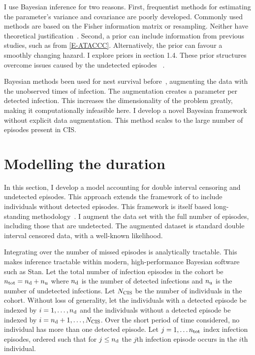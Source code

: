 \documentclass[thesis.tex]{subfiles}
\begin{document}
I use Bayesian inference for two reasons.
First, frequentist methods for estimating the parameter's variance and covariance are poorly developed.
Commonly used methods are based on the Fisher information matrix or resampling.
Neither have theoretical justification~\autocite[230]{sunAnalysis}.
Second, a prior can include information from previous studies, such as from \cref{E-ATACCC}.
Alternatively, the prior can favour a smoothly changing hazard.
I explore priors in section 1.4.
These prior structures overcome issues caused by the undetected episodes ~\autocite{caoBias}.

Bayesian methods been used for nest survival before~\autocites{heBayesiana}{heBayesian}{caoModeling}, augmenting the data with the unobserved times of infection.
The augmentation creates a parameter per detected infection.
This increases the dimensionality of the problem greatly, making it computationally infeasible here.
I develop a novel Bayesian framework without explicit data augmentation.
This method scales to the large number of episodes present in CIS.


\section{Modelling the duration}\label{perf-test:sec:model}

In this section, I develop a model accounting for double interval censoring and undetected episodes.
This approach extends the framework of \textcite{heiseyModelling} to include individuals without detected episodes.
This framework is itself based long-standing methodology~\autocites{dempsterMaximum}{turnbullEmpirical}.
I augment the data set with the full number of episodes, including those that are undetected.
The augmented dataset is standard double interval censored data, with a well-known likelihood.

Integrating over the number of missed episodes is analytically tractable.
This makes inference tractable within modern, high-performance Bayesian software such as Stan.
Let the total number of infection episodes in the cohort be $n_\text{tot} = n_\text{d} + n_\text{u}$ where $n_\text{d}$ is the number of detected infections and $n_\text{u}$ is the number of undetected infections.
Let $N_\text{CIS}$ be the number of individuals in the cohort.
Without loss of generality, let the individuals with a detected episode be indexed by $i = 1, \dots, n_\text{d}$ and the individuals without a detected episode be indexed by $i = n_\text{d} + 1, \dots, N_\text{CIS}$.
Over the short period of time considered, no individual has more than one detected episode. 
Let $j = 1, \dots n_\text{tot}$ index infection episodes, ordered such that for $j \leq n_\text{d}$ the $j$th infection episode occurs in the $i$th individual.
\end{document}
